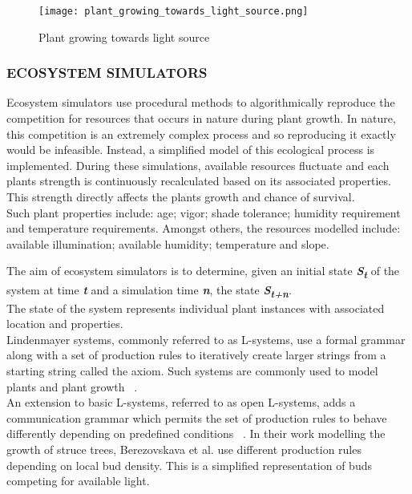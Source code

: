 \begin{figure}[h]
  \centering
	  \label{Plant growing towards light source}
	    \texttt{[image: plant\_growing\_towards\_light\_source.png]}
	\caption{Plant growing towards light source ~\cite{Soler2001} }
\end{figure}

\subsubsection{ECOSYSTEM SIMULATORS}

Ecosystem simulators use procedural methods to algorithmically reproduce the competition for resources that occurs in nature during plant growth. In nature, this competition is an extremely complex process and so reproducing it exactly would be infeasible. Instead, a simplified model of this ecological process is implemented. During these simulations, available resources fluctuate and each plants strength is continuously recalculated based on its associated properties. This strength directly affects the plants growth and chance of survival. \\
Such plant properties include: age; vigor; shade tolerance; humidity requirement and temperature requirements. Amongst others, the resources modelled include: available illumination; available humidity; temperature and slope.

The aim of ecosystem simulators is to determine, given an initial state \textbf{\textit{S\textsubscript{t}}} of the system at time \textbf{\textit{t}} and a simulation time \textbf{\textit{n}}, the state \textbf{\textit{S\textsubscript{t+n}}}. \\
The state of the system represents individual plant instances with associated location and properties. \\

Lindenmayer systems, commonly referred to as L-systems, use a formal grammar along with a set of production rules to iteratively create larger strings from a starting string called the axiom. Such systems are commonly used to model plants and plant growth ~\cite{Prusinkiewicz1990,Deussen2002,Boudon2012,Prusinkiewicz1993}. \\
An extension to basic L-systems, referred to as open L-systems, adds a communication grammar which permits the set of production rules to behave differently depending on predefined conditions ~\cite{Prusinkiewicz1996}. In their work modelling the growth of struce trees, Berezovskava et al. \cite{Berezovskava1997} use different production rules depending on local bud density. This is a simplified representation of buds competing for available light. \\

